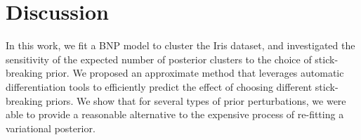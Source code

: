 \documentclass[a4paper]{article}
\begin{document}
\section{Discussion}
In this work, we fit a BNP model to cluster the Iris dataset, and
investigated the sensitivity of the expected number of
posterior clusters to the choice of stick-breaking prior. We proposed an approximate
method that leverages automatic differentiation tools
to efficiently predict the effect of choosing different stick-breaking priors. We show
that for several types of prior perturbations, we were able to provide a reasonable
alternative to the expensive process of re-fitting a variational posterior.
\end{document}
